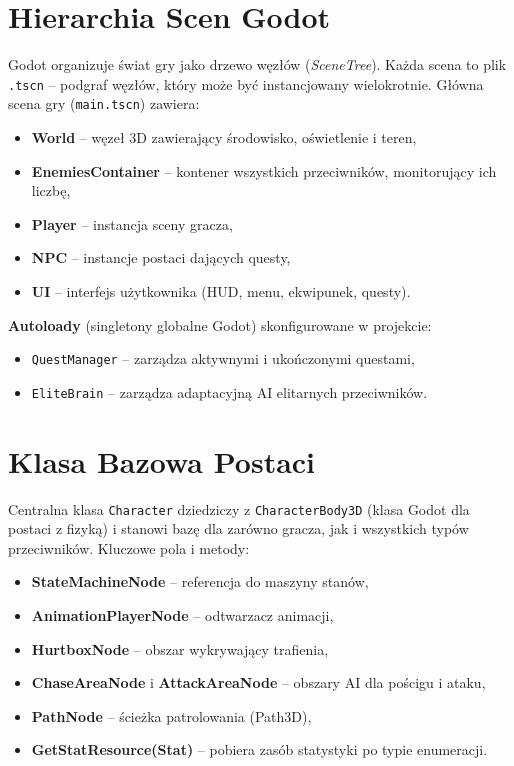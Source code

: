 \section{Hierarchia Scen Godot}

Godot organizuje świat gry jako drzewo węzłów (\textit{SceneTree}). Każda scena to plik \texttt{.tscn} – podgraf węzłów, który może być instancjowany wielokrotnie. Główna scena gry (\texttt{main.tscn}) zawiera:

\begin{itemize}
    \item \textbf{World} – węzeł 3D zawierający środowisko, oświetlenie i teren,
    \item \textbf{EnemiesContainer} – kontener wszystkich przeciwników, monitorujący ich liczbę,
    \item \textbf{Player} – instancja sceny gracza,
    \item \textbf{NPC} – instancje postaci dających questy,
    \item \textbf{UI} – interfejs użytkownika (HUD, menu, ekwipunek, questy).
\end{itemize}

\textbf{Autoloady} (singleto­ny globalne Godot) skonfigurowane w projekcie:
\begin{itemize}
    \item \texttt{QuestManager} – zarządza aktywnymi i ukończonymi questami,
    \item \texttt{EliteBrain} – zarządza adaptacyjną AI elitarnych przeciwników.
\end{itemize}

\section{Klasa Bazowa Postaci}

Centralna klasa \texttt{Character} dziedziczy z \texttt{CharacterBody3D} (klasa Godot dla postaci z fizyką) i stanowi bazę dla zarówno gracza, jak i wszystkich typów przeciwników. Kluczowe pola i metody:

\begin{itemize}
    \item \textbf{StateMachineNode} – referencja do maszyny stanów,
    \item \textbf{AnimationPlayerNode} – odtwarzacz animacji,
    \item \textbf{HurtboxNode} – obszar wykrywający trafienia,
    \item \textbf{ChaseAreaNode} i \textbf{AttackAreaNode} – obszary AI dla pościgu i ataku,
    \item \textbf{PathNode} – ścieżka patrolowania (Path3D),
    \item \textbf{GetStatResource(Stat)} – pobiera zasób statystyki po typie enumeracji.
\end{itemize}

